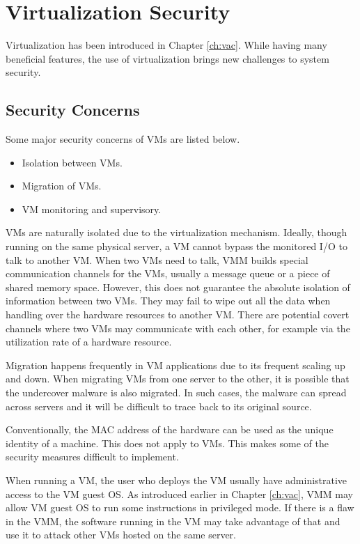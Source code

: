 \section{Virtualization Security}

Virtualization has been introduced in Chapter \ref{ch:vac}. While having many beneficial features, the use of virtualization brings new challenges to system security.

\subsection{Security Concerns}

Some major security concerns of VMs are listed below.
\begin{itemize}
	\item Isolation between VMs.
	\item Migration of VMs.
	\item VM monitoring and supervisory.
\end{itemize}

VMs are naturally isolated due to the virtualization mechanism. Ideally, though running on the same physical server, a VM cannot bypass the monitored I/O to talk to another VM. When two VMs need to talk, VMM builds special communication channels for the VMs, usually a message queue or a piece of shared memory space. However, this does not guarantee the absolute isolation of information between two VMs. They may fail to wipe out all the data when handling over the hardware resources to another VM. There are potential covert channels where two VMs may communicate with each other, for example via the utilization rate of a hardware resource. 

Migration happens frequently in VM applications due to its frequent scaling up and down. When migrating VMs from one server to the other, it is possible that the undercover malware is also migrated. In such cases, the malware can spread across servers and it will be difficult to trace back to its original source. 

Conventionally, the MAC address of the hardware can be used as the unique identity of a machine. This does not apply to VMs. This makes some of the security measures difficult to implement.

When running a VM, the user who deploys the VM usually have administrative access to the VM guest OS. As introduced earlier in Chapter \ref{ch:vac}, VMM may allow VM guest OS to run some instructions in privileged mode. If there is a flaw in the VMM, the software running in the VM may take advantage of that and use it to attack other VMs hosted on the same server.

